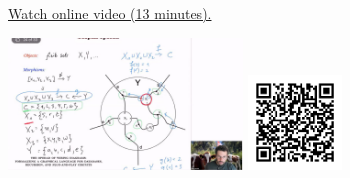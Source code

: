 
\begin{minipage}{10cm}
    \href{https://act4e-spring21.netlify.app/videos/spring2021-operads-b:co-span-operad.html}{Watch online video (13 minutes).}
        
    \href{https://act4e-spring21.netlify.app/videos/spring2021-operads-b:co-span-operad.html}{\includegraphics[height=3.5cm]{spring2021-operads-b:co-span-operad/thumbnails.jpg}}
    \href{https://act4e-spring21.netlify.app/videos/spring2021-operads-b:co-span-operad.html}{\includegraphics[height=2.5cm]{spring2021-operads-b:co-span-operad/qrcode.png}}
\end{minipage}
